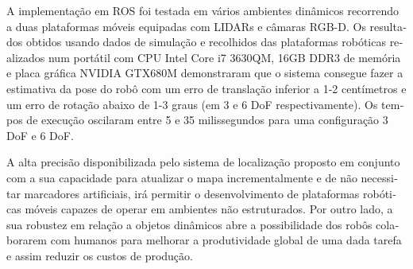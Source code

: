 \begin{otherlanguage}{portuguese}
A implementação em ROS foi testada em vários ambientes dinâmicos recorrendo a duas plataformas móveis equipadas com LIDARs e câmaras RGB-D. Os resultados obtidos usando dados de simulação e recolhidos das plataformas robóticas realizados num portátil com CPU Intel Core i7 3630QM, 16GB DDR3 de memória e placa gráfica NVIDIA GTX680M demonstraram que o sistema consegue fazer a estimativa da pose do robô com um erro de translação inferior a 1-2 centímetros e um erro de rotação abaixo de 1-3 graus (em 3 e 6 DoF respectivamente). Os tempos de execução oscilaram entre 5 e 35 milissegundos para uma configuração 3 DoF e 6 DoF.

A alta precisão disponibilizada pelo sistema de localização proposto em conjunto com a sua capacidade para atualizar o mapa incrementalmente e de não necessitar marcadores artificiais, irá permitir o desenvolvimento de plataformas robóticas móveis capazes de operar em ambientes não estruturados. Por outro lado, a sua robustez em relação a objetos dinâmicos abre a possibilidade dos robôs colaborarem com humanos para melhorar a produtividade global de uma dada tarefa e assim reduzir os custos de produção.

\end{otherlanguage}

